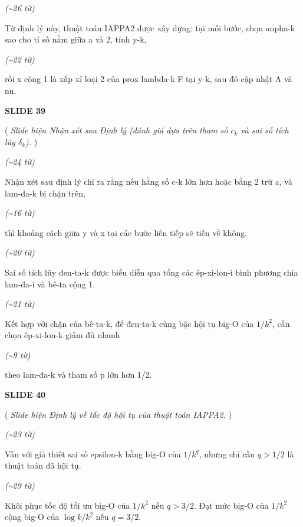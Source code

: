 ﻿\documentclass[12pt]{article}
\newcommand{\scene}[1]{
    \vspace{18pt}
    \normalsize
    \noindent\textbf{\MakeUppercase{#1}}
    \vspace{12pt}
}
\newcommand{\action}[1]{
    \vspace{6pt}
    \small
    \noindent(\textit{#1})
    \vspace{6pt}
}
\newenvironment{speech}{
    \normalsize
    \begin{list}{}{
        \leftmargin=1.25in
        \rightmargin=1.25in
        \parsep=0pt
        \topsep=0pt
        \partopsep=0pt
    }
    \item[]
}{
    \end{list}
    \vspace{6pt}
}
\newcommand{\block}[1]{
    \vspace{4pt}
    \noindent\hspace{1.5in}\textit{(\textasciitilde #1 từ)}
}
\begin{document}
\block{26}
\begin{speech}
    Từ định lý này, thuật toán IAPPA2 được xây dựng: tại mỗi bước, chọn anpha-k sao cho tỉ số nằm giữa a và 2, tính y-k,
\end{speech}

\block{22}
\begin{speech}
    rồi x cộng 1 là xấp xỉ loại 2 của prox lambda-k F tại y-k, sau đó cập nhật A và nu.
\end{speech}

\scene{SLIDE 39}

\action{
    Slide hiện Nhận xét sau Định lý (đánh giá dựa trên tham số $c_k$ và sai số tích lũy $\delta_k$).
}

\block{24}
\begin{speech}
    Nhận xét sau định lý chỉ ra rằng nếu hằng số c-k lớn hơn hoặc bằng 2 trừ a, và lam-đa-k bị chặn trên,
\end{speech}

\block{16}
\begin{speech}
    thì khoảng cách giữa y và x tại các bước liên tiếp sẽ tiến về không.
\end{speech}

\block{20}
\begin{speech}
    Sai số tích lũy đen-ta-k được biểu diễn qua tổng các êp-xi-lon-i bình phương chia lam-đa-i và bê-ta cộng 1.
\end{speech}

\block{21}
\begin{speech}
    Kết hợp với chặn của bê-ta-k, để đen-ta-k cùng bậc hội tụ big-O của $1/k^2$, cần chọn êp-xi-lon-k giảm đủ nhanh
\end{speech}

\block{9}
\begin{speech}
    theo lam-đa-k và tham số p lớn hơn 1/2.
\end{speech}

\scene{SLIDE 40}

\action{
    Slide hiện Định lý về tốc độ hội tụ của thuật toán IAPPA2.
}

\block{23}
\begin{speech}
    Vẫn với giả thiết sai số epsilon-k bằng big-O của $1/k^q$, nhưng chỉ cần $q > 1/2$ là thuật toán đã hội tụ.
\end{speech}

\block{29}
\begin{speech}
    Khôi phục tốc độ tối ưu big-O của $1/k^2$ nếu $q > 3/2$. Đạt mức big-O của $1/k^2$ cộng big-O của $\log k / k^2$ nếu $q = 3/2$.
\end{speech}
\end{document}
